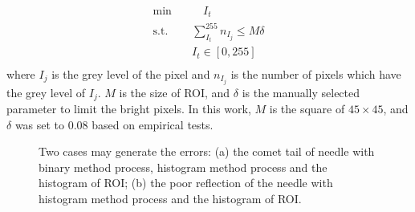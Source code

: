 \documentclass[journal,article,submit,moreauthors,pdftex]{Definitions/mdpi}
\begin{document}
\begin{equation}
	\begin{aligned}
		\textrm{min} \quad  & \quad I_t                             \\
		\textrm{s.t.} \quad & \sum_{I_t}^{255} n_{I_j} \leq M\delta \\
		                    & I_t\in[0,255]                         \\
	\end{aligned}
\end{equation}
where ${I_j}$ is the grey level of the pixel and ${n_{I_j}}$ is the number of pixels which have the grey level of ${I_j}$.
${M}$ is the size of ROI, and ${\delta}$ is the manually selected parameter to limit the bright pixels.
In this work, ${M}$ is the square of ${45\times45}$, and ${\delta}$ was set to 0.08 based on empirical tests.

\begin{figure}[H]
	\centering
	\captionsetup{width=16 cm,justification=centering}
	\caption{Two cases may generate the errors: (a) the comet tail of needle with binary method process, histogram method process and the histogram of ROI; (b) the poor reflection of the needle with histogram method process and the histogram of ROI.}
	\label{fig:3}
\end{figure}
\end{document}
